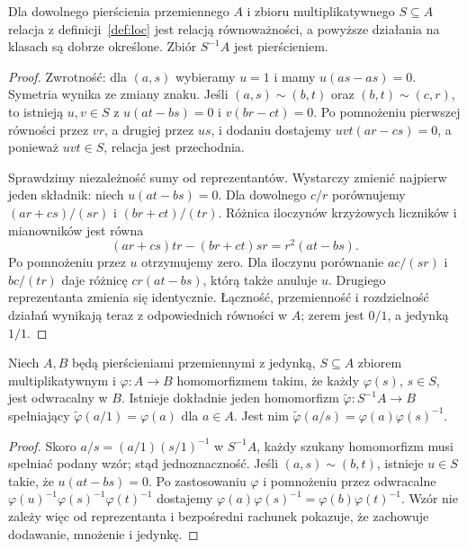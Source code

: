 \begin{stwierdzenie}
\label{st:loc-popr}
Dla dowolnego pierścienia przemiennego $A$ i zbioru
multiplikatywnego $S\subseteq A$ relacja z definicji~\ref{def:loc}
jest relacją równoważności, a powyższe działania na klasach
są dobrze określone. Zbiór $S^{-1}A$ jest pierścieniem.
\end{stwierdzenie}
\begin{proof}
Zwrotność: dla $(a,s)$ wybieramy $u=1$ i mamy
$u(as-as)=0$. Symetria wynika ze zmiany znaku.
Jeśli $(a,s)\sim(b,t)$ oraz $(b,t)\sim(c,r)$,
to istnieją $u,v\in S$ z $u(at-bs)=0$ i $v(br-ct)=0$.
Po pomnożeniu pierwszej równości przez $vr$,
a drugiej przez $us$, i dodaniu dostajemy
$uvt(ar-cs)=0$, a ponieważ $uvt\in S$, relacja jest
przechodnia.

Sprawdzimy niezależność sumy od reprezentantów. Wystarczy
zmienić najpierw jeden składnik: niech $u(at-bs)=0$.
Dla dowolnego $c/r$ porównujemy
$(ar+cs)/(sr)$ i $(br+ct)/(tr)$.
Różnica iloczynów krzyżowych liczników i mianowników
jest równa
\[
 (ar+cs)tr-(br+ct)sr=r^2(at-bs).
\]
Po pomnożeniu przez $u$ otrzymujemy zero. Dla iloczynu
porównanie $ac/(sr)$ i $bc/(tr)$ daje różnicę
$cr(at-bs)$, którą także anuluje $u$. Drugiego
reprezentanta zmienia się identycznie.
Łączność, przemienność i rozdzielność działań
wynikają teraz z odpowiednich równości w $A$;
zerem jest $0/1$, a jedynką $1/1$.
\end{proof}

\begin{twierdzenie}
\label{tw:loc-up}
Niech $A,B$ będą pierścieniami przemiennymi z jedynką,
$S\subseteq A$ zbiorem multiplikatywnym i
$\varphi:A\to B$ homomorfizmem takim, że każdy
$\varphi(s)$, $s\in S$, jest odwracalny w $B$.
Istnieje dokładnie jeden homomorfizm
$\widetilde\varphi:S^{-1}A\to B$ spełniający
$\widetilde\varphi(a/1)=\varphi(a)$ dla $a\in A$.
Jest nim $\widetilde\varphi(a/s)=\varphi(a)\varphi(s)^{-1}$.
\end{twierdzenie}
\begin{proof}
Skoro $a/s=(a/1)(s/1)^{-1}$ w $S^{-1}A$,
każdy szukany homomorfizm musi spełniać podany wzór;
stąd jednoznaczność. Jeśli $(a,s)\sim(b,t)$,
istnieje $u\in S$ takie, że $u(at-bs)=0$. Po
zastosowaniu $\varphi$ i pomnożeniu przez odwracalne
$\varphi(u)^{-1}\varphi(s)^{-1}\varphi(t)^{-1}$
dostajemy $\varphi(a)\varphi(s)^{-1}
=\varphi(b)\varphi(t)^{-1}$.
Wzór nie zależy więc od reprezentanta i bezpośredni
rachunek pokazuje, że zachowuje dodawanie, mnożenie
i jedynkę.
\end{proof}

